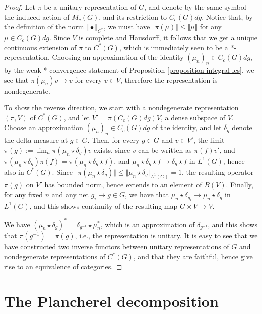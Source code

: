 \begin{proof}
Let $\pi$ be a unitary representation of $G$, and denote by the same symbol the induced action of $M_c(G)$, and its restriction to $C_c(G)dg$. Notice that, by the definition of the norm $\Vert\bullet\Vert_{C^*}$, we must have $\Vert \pi(\mu)\Vert\leq \Vert\mu\Vert$ for any $\mu\in C_c(G)dg$. Since $V$ is complete and Hausdorff, it follows that we get a unique continuous extension of $\pi$ to $C^*(G)$, which is immediately seen to be a *-representation. Choosing an approximation of the identity $(\mu_n)_n \in C_c(G)dg$, by the weak-* convergence statement of Proposition \ref{proposition-integral-lcs}, we see that $\pi(\mu_n) v \to v$ for every $v\in V$, therefore the representation is nondegenerate. 

To show the reverse direction, we start with a nondegenerate representation $(\pi, V)$ of $C^*(G)$, and let $V' =\pi(C_c(G)dg)V$, a dense subspace of $V$. Choose an approximation $(\mu_n)_n \in C_c(G)dg$ of the identity, and let $\delta_g$ denote the delta measure at $g\in G$. Then, for every $g\in G$ and $v\in V'$, the limit $\pi(g):=\lim_n \pi(\mu_n\star \delta_g) v$ exists, since $v$ can be written as $\pi(f)v'$, and $\pi(\mu_n\star \delta_g) \pi(f) = \pi(\mu_n\star \delta_g \star f)$, and $\mu_n\star \delta_g \star f \to \delta_g \star f$ in $L^1(G)$, hence also in $C^*(G)$. Since $\Vert \pi(\mu_n\star \delta_g)\Vert \le \Vert \mu_n\star \delta_g\Vert_{L^1(G)} = 1$, the resulting operator $\pi(g)$ on $V'$ has bounded norm, hence extends to an element of $B(V)$.  Finally, for any fixed $n$ and any net $g_i\to g \in G$, we have that $\mu_n\star \delta_{g_i} \to \mu_n\star \delta_g$ in $L^1(G)$, and this shows continuity of the resulting map $G\times V\to V$. 

We have $(\mu_n\star \delta_g)^* = \delta_{g^{-1}} \star \mu_n^*$, which is an approximation of $\delta_{g^{-1}}$, and this shows that $\pi(g^{-1}) = \pi(g)$, i.e., the representation is unitary. It is easy to see that we have constructed two inverse functors between unitary representations of $G$ and nondegenerate representations of $C^*(G)$, and that they are faithful, hence give rise to an equivalence of categories.
\end{proof}



\section{The Plancherel decomposition}
\label{section-Plancherel}

